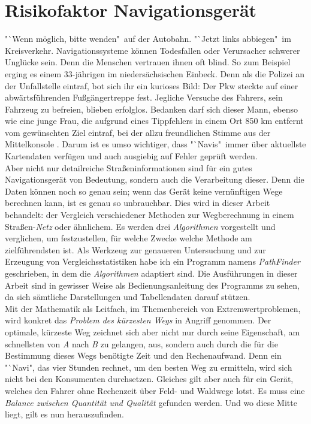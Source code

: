 \documentclass[12pt]{article}
\begin{document}
\section{Risikofaktor Navigationsgerät}
"`Wenn möglich, bitte wenden"\ auf der Autobahn. "`Jetzt links abbiegen"\ im Kreisverkehr. Navigationssysteme können Todesfallen oder Verursacher schwerer Unglücke sein. Denn die Menschen vertrauen ihnen oft blind. So zum Beispiel erging es einem 33-jährigen im niedersächsischen Einbeck. Denn als die Polizei an der Unfallstelle eintraf, bot sich ihr ein kurioses Bild: Der Pkw steckte auf einer abwärtsführenden Fußgängertreppe fest. Jegliche Versuche des Fahrers, sein Fahrzeug zu befreien, blieben erfolglos. Bedanken darf sich dieser Mann, ebenso wie eine junge Frau, die aufgrund eines Tippfehlers in einem Ort 850 km entfernt vom gewünschten Ziel eintraf, bei der allzu freundlichen Stimme aus der Mittelkonsole \cite{navi}. Darum ist es umso wichtiger, dass "`Navis"\ immer über aktuellste Kartendaten verfügen und auch ausgiebig auf Fehler geprüft werden. 
\\
Aber nicht nur detailreiche Straßeninformationen sind für ein gutes Navigationsgerät von Bedeutung, sondern auch die Verarbeitung dieser. Denn die Daten können noch so genau sein; wenn das Gerät keine vernünftigen Wege berechnen kann, ist es genau so unbrauchbar. Dies wird in dieser Arbeit behandelt: der Vergleich verschiedener Methoden zur Wegberechnung in einem Straßen-\textit{Netz} oder ähnlichem. Es werden drei \textit{Algorithmen} vorgestellt und verglichen, um festzustellen, für welche Zwecke welche Methode am zielführendsten ist. Als Werkzeug zur genaueren Untersuchung und zur Erzeugung von Vergleichsstatistiken habe ich ein Programm namens \textit{PathFinder} geschrieben, in dem die \textit{Algorithmen} adaptiert sind. Die Ausführungen in dieser Arbeit sind in gewisser Weise als Bedienungsanleitung des Programms zu sehen, da sich sämtliche Darstellungen und Tabellendaten darauf stützen. 
\\
Mit der Mathematik als Leitfach, im Themenbereich von Extremwertproblemen, wird konkret das \textit{Problem des kürzesten Wegs} in Angriff genommen. Der optimale, kürzeste Weg zeichnet sich aber nicht nur durch seine Eigenschaft, am schnellsten von \textit{A} nach \textit{B} zu gelangen, aus, sondern auch durch die für die Bestimmung dieses Wegs benötigte Zeit und den Rechenaufwand. Denn ein "`Navi", das vier Stunden rechnet, um den besten Weg zu ermitteln, wird sich nicht bei den Konsumenten durchsetzen. Gleiches gilt aber auch für ein Gerät, welches den Fahrer ohne Rechenzeit über Feld- und Waldwege lotst. Es muss eine \textit{Balance zwischen Quantität und Qualität} gefunden werden. Und wo diese Mitte liegt, gilt es nun herauszufinden.
\newpage
\end{document}
